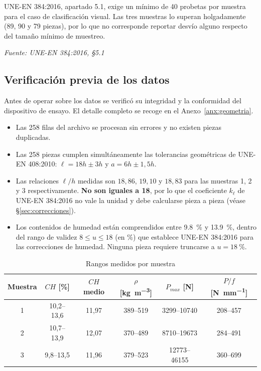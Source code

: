 \documentclass[11pt,a4paper]{article}
\newcommand{\fuente}[1]{{\small\textit{Fuente: #1}}}
\begin{document}
\noindent UNE-EN 384:2016, apartado 5.1, exige un mínimo de \num{40} probetas por muestra
para el caso de clasificación visual. Las tres muestras lo superan holgadamente
(\num{89}, \num{90} y \num{79} piezas), por lo que no corresponde reportar desvío
alguno respecto del tamaño mínimo de muestreo.

\fuente{UNE-EN 384:2016, \S5.1}

\subsection{Verificación previa de los datos}

Antes de operar sobre los datos se verificó su integridad y la conformidad del
dispositivo de ensayo. El detalle completo se recoge en el Anexo~\ref{anx:geometria}.

\begin{itemize}
  \item Las \num{258} filas del archivo se procesan sin errores y no existen piezas
        duplicadas.
  \item Las \num{258} piezas cumplen simultáneamente las tolerancias geométricas de
        UNE-EN 408:2010: $\ell = 18h \pm 3h$ y $a = 6h \pm 1{,}5h$.
  \item Las relaciones $\ell/h$ medidas son $18{,}86$, $19{,}10$ y $18{,}83$ para las
        muestras 1, 2 y 3 respectivamente. \textbf{No son iguales a 18}, por lo que el
        coeficiente $k_\ell$ de UNE-EN 384:2016 no vale la unidad y debe calcularse
        pieza a pieza (véase \S\ref{sec:correcciones}).
  \item Los contenidos de humedad están comprendidos entre \SI{9,8}{\percent} y
        \SI{13,9}{\percent}, dentro del rango de validez
        $8 \leq u \leq 18$ (en \si{\percent}) que establece UNE-EN 384:2016 para las
        correcciones de humedad. Ninguna pieza requiere truncarse a
        $u = \SI{18}{\percent}$.
\end{itemize}

\begin{table}[htbp]
\centering
\caption{Rangos medidos por muestra}
\label{tab:rangos}
\begin{tabular}{c c c c c c}
\toprule
\textbf{Muestra} & \textbf{$CH$ [\si{\percent}]} & \textbf{$CH$ medio} &
\textbf{$\rho$ [\si{\kilo\gram\per\cubic\meter}]} & \textbf{$P_{max}$ [\si{\newton}]} &
\textbf{$P/f$ [\si{\newton\per\milli\meter}]} \\
\midrule
1 & 10,2--13,6 & 11,97 & 389--519 & \numrange{3299}{10740}  & 208--457 \\
2 & 10,7--13,9 & 12,07 & 370--489 & \numrange{8710}{19673}  & 284--491 \\
3 & 9,8--13,5  & 11,96 & 379--523 & \numrange{12773}{46155} & 360--699 \\
\bottomrule
\end{tabular}
\end{table}
\end{document}
